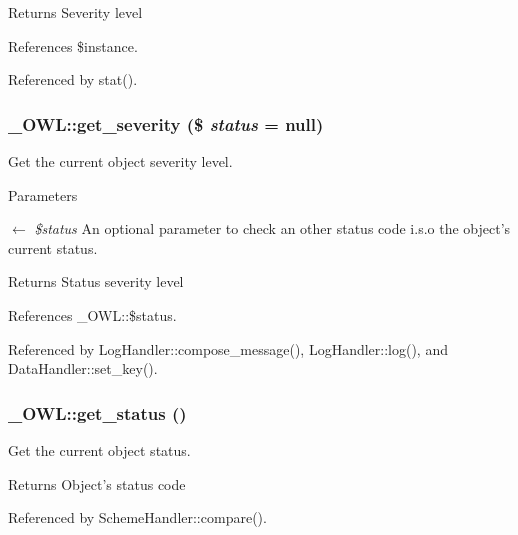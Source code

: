 \begin{DoxyReturn}{Returns}
Severity level 
\end{DoxyReturn}


References \$instance.



Referenced by stat().

\subsubsection[{get\_\-severity}]{\setlength{\rightskip}{0pt plus 5cm}\_\-OWL::get\_\-severity (\$ {\em status} = {\ttfamily null})}\label{class__OWL_adf9509ef96858be7bdd9414c5ef129aa}
Get the current object severity level.


\begin{DoxyParams}{Parameters}
\item[\mbox{$\leftarrow$} {\em \$status}]An optional parameter to check an other status code i.s.o the object's current status. \end{DoxyParams}
\begin{DoxyReturn}{Returns}
Status severity level 
\end{DoxyReturn}


References \_\-OWL::\$status.



Referenced by LogHandler::compose\_\-message(), LogHandler::log(), and DataHandler::set\_\-key().

\subsubsection[{get\_\-status}]{\setlength{\rightskip}{0pt plus 5cm}\_\-OWL::get\_\-status ()}\label{class__OWL_a99ec771fa2c5c279f80152cc09e489a8}
Get the current object status.

\begin{DoxyReturn}{Returns}
Object's status code 
\end{DoxyReturn}


Referenced by SchemeHandler::compare().

